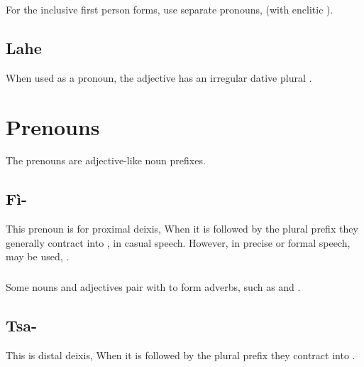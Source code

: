 \subsubsection{} For the inclusive first person forms, use separate
pronouns,  (with enclitic  ).


\subsection{Lahe} When used as a pronoun, the adjective 
 has an irregular dative plural .
\label{morph:lahe:dat-pl}



\section{Prenouns}

\noindent The prenouns are adjective-like noun prefixes. 

\subsection{Fì-} This prenoun is for proximal deixis,   When
it is followed by the plural prefix  they generally contract
into ,  in casual speech.  However, in precise or
formal speech,  may be used, . \label{morph:prenoun:fi}
 

\subsubsection{} Some nouns and adjectives pair with  to form
adverbs, such as   and  .

\subsection{Tsa-} This is distal deixis,   When it is
followed by the plural prefix  they contract into 
. 
 

